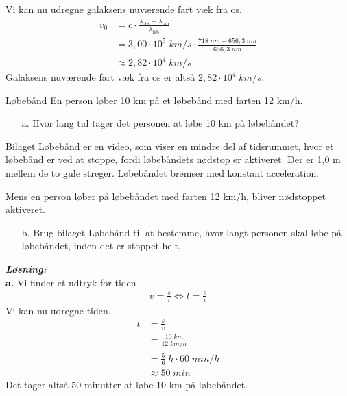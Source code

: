 \documentclass{report}
\newcommand{\sol}{\setlength{\parindent}{0cm}\textbf{\textit{Løsning:}}\setlength{\parindent}{1cm}}
\begin{document}
Vi kan nu udregne galaksens nuværende fart væk fra os.
\begin{equation*}
\begin{split}
  v_0&=c \cdot \frac{\lambda _{\text{obs} }- \lambda _{\text{lab}}}{\lambda _{\text{lab} }}\\
  &=3,00 \cdot 10 ^{5} \;\unit{km/s} \cdot \frac{718 \;\unit{nm} - 656,3 \;\unit{nm} }{656,3 \;\unit{nm} }\\
  &\approx 2,82 \cdot 10^4 \;\unit{km/s} 
\end{split}
\end{equation*}
Galaksens nuværende fart væk fra os er altså $2,82 \cdot 10^4 \;\unit{km/s} $.
\begin{question}{Løbebånd}{}
En person løber 10 km på et løbebånd med farten 12 km/h.
\begin{itemize}
  \item[a.] Hvor lang tid tager det personen at løbe 10 km på løbebåndet?
\end{itemize}
Bilaget Løbebånd er en video, som viser en mindre del af tidsrummet, hvor et løbebånd er ved at stoppe, fordi løbebåndets nødstop er aktiveret. Der er 1,0 m mellem de to gule streger. Løbebåndet bremser med konstant acceleration.

Mens en person løber på løbebåndet med farten 12 km/h, bliver nødstoppet aktiveret.
\begin{itemize}
  \item[b.] Brug bilaget Løbebånd til at bestemme, hvor langt personen skal løbe på løbebåndet, inden det er stoppet helt.
\end{itemize}
\end{question}
\sol \\
\textbf{a.}
Vi finder et udtryk for tiden
\begin{equation*}
\begin{split}
  v=\frac{s}{t} \iff  t=\frac{s}{v}
\end{split}
\end{equation*}
Vi kan nu udregne tiden.
\begin{equation*}
\begin{split}
  t&=\frac{s}{v}\\
  &=\frac{10 \;\unit{km} }{12 \;\unit{km/h} }\\
  &=\frac{5}{6} \;\unit{h} \cdot 60 \;\unit{min/h} \\
  &\approx 50 \;\unit{min} 
\end{split}
\end{equation*}
Det tager altså 50 minutter at løbe 10 km på løbebåndet. \\[1ex]
\end{document}
